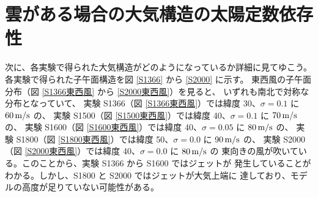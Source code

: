\documentclass[body]{subfiles}
\begin{document}
\afterpage{\clearpage}

\section{雲がある場合の大気構造の太陽定数依存性}

次に、各実験で得られた大気構造がどのようになっているか詳細に見てゆこう。
各実験で得られた子午面構造を図 \ref{S1366} から \ref{S2000} に示す。
東西風の子午面分布（図 \ref{S1366東西風} から \ref{S2000東西風}）を見ると、
いずれも南北で対称な分布となっていて、
実験 S1366（図 \ref{S1366東西風}）では緯度 30\textdegree 、\(\sigma=0.1\) に \(60\hmu{m/s}\) の、
実験 S1500（図 \ref{S1500東西風}）では緯度 40\textdegree 、\(\sigma=0.1\) に \(70\hmu{m/s}\) の、
実験 S1600（図 \ref{S1600東西風}）では緯度 40\textdegree 、\(\sigma=0.05\) に \(80\hmu{m/s}\) の、
実験 S1800（図 \ref{S1800東西風}）では緯度 50\textdegree 、\(\sigma=0.0\) に \(90\hmu{m/s}\) の、
実験 S2000（図 \ref{S2000東西風}）では緯度 40\textdegree 、\(\sigma=0.0\) に \(80\hmu{m/s}\) の
東向きの風が吹いている。このことから、実験 S1366 から S1600 ではジェットが
発生していることがわかる。しかし、S1800 と S2000 ではジェットが大気上端に
達しており、モデルの高度が足りていない可能性がある。
\end{document}
